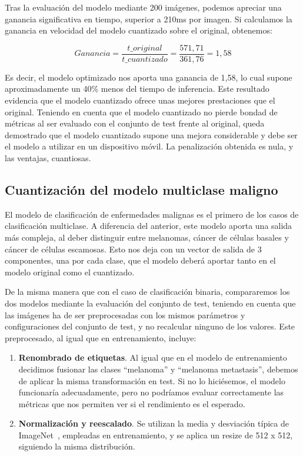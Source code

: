 Tras la evaluación del modelo mediante 200 imágenes, podemos apreciar una ganancia significativa en tiempo, superior a 210ms por imagen. Si calculamos la ganancia en velocidad del modelo cuantizado sobre el original, obtenemos:

$$Ganancia = \frac{t\_original}{t\_cuantizado} = \frac{571,71}{361,76} = 1,58$$

Es decir, el modelo optimizado nos aporta una ganancia de 1,58, lo cual supone aproximadamente un 40\% menos del tiempo de inferencia. Este resultado evidencia que el modelo cuantizado ofrece unas mejores prestaciones que el original. Teniendo en cuenta que el modelo cuantizado no pierde bondad de métricas al ser evaluado con el conjunto de test frente al original, queda demostrado que el modelo cuantizado supone una mejora considerable y debe ser el modelo a utilizar en un dispositivo móvil. La penalización obtenida es nula, y las ventajas, cuantiosas.

\subsection{Cuantización del modelo multiclase maligno}

El modelo de clasificación de enfermedades malignas es el primero de los casos de clasificación multiclase. A diferencia del anterior, este modelo aporta una salida más compleja, al deber distinguir entre melanomas, cáncer de células basales y cáncer de células escamosas. Esto nos deja con un vector de salida de 3 componentes, una por cada clase, que el modelo deberá aportar tanto en el modelo original como el cuantizado.

De la misma manera que con el caso de clasificación binaria, compararemos los dos modelos mediante la evaluación del conjunto de test, teniendo en cuenta que las imágenes ha de ser preprocesadas con los mismos parámetros y configuraciones del conjunto de test, y no recalcular ninguno de los valores. Este preprocesado, al igual que en entrenamiento, incluye:

\begin{enumerate}
	\item \textbf{Renombrado de etiquetas}. Al igual que en el modelo de entrenamiento decidimos fusionar las clases ``melanoma'' y ``melanoma metastasis'', debemos de aplicar la misma transformación en test. Si no lo hiciésemos, el modelo funcionaría adecuadamente, pero no podríamos evaluar correctamente las métricas que nos permiten ver si el rendimiento es el esperado.
	 \item \textbf{Normalización y reescalado}. Se utilizan la media y desviación típica de ImageNet~\cite{5206848}, empleadas en entrenamiento, y se aplica un resize de 512 x 512, siguiendo la misma distribución.
\end{enumerate}

